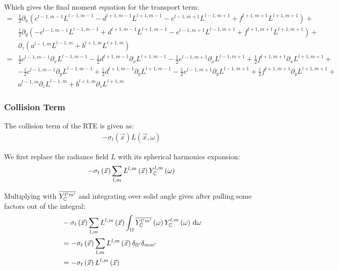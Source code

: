 \documentclass[10pt]{scrartcl}
\begin{document}
Which gives the final moment equation for the transport term:
\begin{align*}
=
&\frac{1}{2}\partial_x\left(c^{l-1, m-1}L^{l-1,m-1} - d^{l+1, m-1}L^{l+1,m-1} - e^{l-1, m+1}L^{l-1,m+1} + f^{l+1, m+1}L^{l+1,m+1}\right) + \\
&\frac{i}{2}\partial_y\left( -c^{l-1, m-1}L^{l-1,m-1} + d^{l+1, m-1}L^{l+1,m-1} - e^{l-1, m+1}L^{l-1,m+1} + f^{l+1, m+1}L^{l+1,m+1} \right) + \\
&\partial_z\left( a^{l-1, m}L^{l-1,m}+b^{l+1, m}L^{l+1,m} \right)
\\
=
&
\frac{1}{2}c^{l-1, m-1}\partial_x L^{l-1,m-1} - \frac{1}{2}d^{l+1, m-1}\partial_x L^{l+1,m-1} - \frac{1}{2}e^{l-1, m+1}\partial_x L^{l-1,m+1} + \frac{1}{2}f^{l+1, m+1}\partial_x L^{l+1,m+1}+
\\
&-\frac{i}{2}c^{l-1, m-1}\partial_y L^{l-1,m-1} + \frac{i}{2}d^{l+1, m-1}\partial_y L^{l+1,m-1} - \frac{i}{2}e^{l-1, m+1}\partial_y L^{l-1,m+1} + \frac{i}{2}f^{l+1, m+1}\partial_y L^{l+1,m+1}+
\\
&
a^{l-1, m}\partial_z L^{l-1,m}+b^{l+1, m}\partial_z L^{l+1,m}
\end{align*}


\subsubsection{Collision Term}

The collision term of the RTE is given as:
\begin{align*}
-\sigma_t\left(\vec{x}\right)L\left(\vec{x}, \omega\right)
\end{align*}

We first replace the radiance field $L$ with its spherical harmonics expansion:
\begin{align*}
-\sigma_t\left(\vec{x}\right)
\sum_{l,m}
{
L^{l,m}\left(\vec{x}\right )Y_{\mathbb{C}}^{l,m}\left(\omega\right)
}
\end{align*}

Multiplying with $\overline{Y_{\mathbb{C}}^{l'm'}}$ and integrating over solid angle gives after pulling some factors out of the integral:
\begin{align*}
&-\sigma_t\left(\vec{x}\right)\sum_{l,m}{L^{l,m}\left(\vec{x}\right )\int_\Omega\overline{Y_{\mathbb{C}}^{l'm'}}\left(\omega\right)Y_{\mathbb{C}}^{l,m}\left(\omega\right)\,\mathrm{d}\omega}\\
&= -\sigma_t\left(\vec{x}\right)\sum_{l,m}{L^{l,m}\left(\vec{x}\right )\delta_{ll'}\delta_{mm'}}\\
&= -\sigma_t\left(\vec{x}\right)L^{l,m}\left(\vec{x}\right )
\end{align*}
\end{document}
